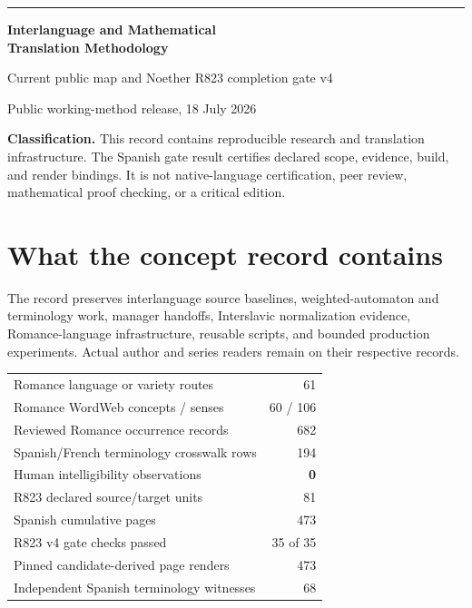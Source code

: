\documentclass[10pt,a4paper]{article}
\begin{document}
{\color{accent}\rule{\textwidth}{1.2pt}}
\vspace{5mm}

{\Huge\bfseries\color{ink} Interlanguage and Mathematical\\Translation Methodology}

\vspace{2mm}
{\Large Current public map and Noether R823 completion gate v4}

\vspace{5mm}
{\small Public working-method release, 18 July 2026}

\vspace{8mm}
\colorbox{soft}{\parbox{0.94\textwidth}{
\textbf{Classification.} This record contains reproducible research and
translation infrastructure. The Spanish gate result certifies declared scope,
evidence, build, and render bindings. It is not native-language certification,
peer review, mathematical proof checking, or a critical edition.
}}

\section*{What the concept record contains}

The record preserves interlanguage source baselines, weighted-automaton and
terminology work, manager handoffs, Interslavic normalization evidence,
Romance-language infrastructure, reusable scripts, and bounded production
experiments. Actual author and series readers remain on their respective
records.

\begin{center}
\begin{tabular}{@{}lr@{}}
\toprule
Romance language or variety routes & 61 \\
Romance WordWeb concepts / senses & 60 / 106 \\
Reviewed Romance occurrence records & 682 \\
Spanish/French terminology crosswalk rows & 194 \\
Human intelligibility observations & \textbf{0} \\
R823 declared source/target units & 81 \\
Spanish cumulative pages & 473 \\
R823 v4 gate checks passed & 35 of 35 \\
Pinned candidate-derived page renders & 473 \\
Independent Spanish terminology witnesses & 68 \\
\bottomrule
\end{tabular}
\end{center}
\end{document}
